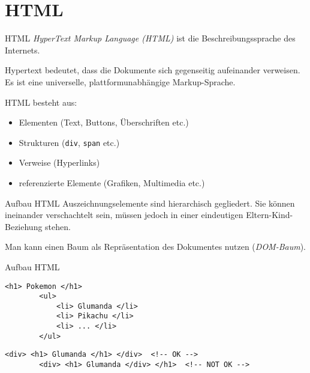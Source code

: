 \section{HTML}

\begin{defi}{HTML}
    \emph{HyperText Markup Language (HTML)} ist die Beschreibungssprache des Internets.

    Hypertext bedeutet, dass die Dokumente sich gegenseitig aufeinander verweisen.
    Es ist eine universelle, plattformunabhängige Markup-Sprache.

    HTML besteht aus:
    \begin{itemize}
        \item Elementen (Text, Buttons, Überschriften etc.)
        \item Strukturen (\texttt{div}, \texttt{span} etc.)
        \item Verweise (Hyperlinks)
        \item referenzierte Elemente (Grafiken, Multimedia etc.)
    \end{itemize}
\end{defi}

\begin{defi}{Aufbau HTML}
    Auszeichnungselemente sind hierarchisch gegliedert.
    Sie können ineinander verschachtelt sein, müssen jedoch in einer eindeutigen Eltern-Kind-Beziehung stehen.

    Man kann einen Baum als Repräsentation des Dokumentes nutzen (\emph{DOM-Baum}).
\end{defi}

\begin{example}{Aufbau HTML}
    \begin{lstlisting}[language=html5]
        <h1> Pokemon </h1>
        <ul>
            <li> Glumanda </li>
            <li> Pikachu </li>
            <li> ... </li>
        </ul>
    \end{lstlisting}

    \begin{lstlisting}[language=html5]
        <div> <h1> Glumanda </h1> </div>  <!-- OK -->
        <div> <h1> Glumanda </div> </h1>  <!-- NOT OK -->
    \end{lstlisting}
\end{example}

